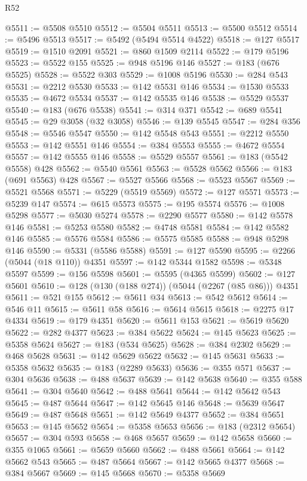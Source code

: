\begin{lexlean}{R52}
\begin{coremodule}
@5511 := @5508 @5510
@5512 := @5504 @5511
@5513 := @5500 @5512
@5514 := @5496 @5513
@5517 := @5492 (@5494 @5514 @4522)
@5518 := @127 @5517
@5519 := @1510 @2091
@5521 := @860 @1509 @2114
@5522 := @179 @5196
@5523 := @5522 @155
@5525 := @948 @5196 @146
@5527 := @183 (@676 @5525)
@5528 := @5522 @303
@5529 := @1008 @5196
@5530 := @284 @543
@5531 := @2212 @5530
@5533 := @142 @5531 @146
@5534 := @1530 @5533
@5535 := @4672 @5534
@5537 := @142 @5535 @146
@5538 := @5529 @5537
@5540 := @183 (@676 @5538)
@5541 := @314 @371
@5542 := @689 @5541
@5545 := @29 @3058 (@32 @3058)
@5546 := @139 @5545
@5547 := @284 @356
@5548 := @5546 @5547
@5550 := @142 @5548 @543
@5551 := @2212 @5550
@5553 := @142 @5551 @146
@5554 := @384 @5553
@5555 := @4672 @5554
@5557 := @142 @5555 @146
@5558 := @5529 @5557
@5561 := @183 (@5542 @5558) @428
@5562 := @5540 @5561
@5563 := @5528 @5562
@5566 := @183 (@691 @5563) @428
@5567 := @5527 @5566
@5568 := @5523 @5567
@5569 := @5521 @5568
@5571 := @5229 (@5519 @5569)
@5572 := @127 @5571
@5573 := @5239 @147
@5574 := @615 @5573
@5575 := @195 @5574
@5576 := @1008 @5298
@5577 := @5030 @5274
@5578 := @2290 @5577
@5580 := @142 @5578 @146
@5581 := @5253 @5580
@5582 := @4748 @5581
@5584 := @142 @5582 @146
@5585 := @5576 @5584
@5586 := @5575 @5585
@5588 := @948 @5298 @146
@5590 := @5331 (@5586 @5588)
@5591 := @127 @5590
@5595 := @2266 (@5044 (@18 @110)) @4351
@5597 := @142 @5344 @1582
@5598 := @5348 @5597
@5599 := @156 @5598
@5601 := @5595 (@4365 @5599)
@5602 := @127 @5601
@5610 := @128 (@130 (@188 @274)) (@5044 (@2267 (@85 @86))) @4351
@5611 := @521 @155
@5612 := @5611 @34
@5613 := @542 @5612
@5614 := @546 @11
@5615 := @5611 @58
@5616 := @5614 @5615
@5618 := @2275 @17 @4334
@5619 := @179 @4351
@5620 := @5611 @153
@5621 := @5619 @5620
@5622 := @282 @4377
@5623 := @384 @5622
@5624 := @145 @5623
@5625 := @5358 @5624
@5627 := @183 (@534 @5625)
@5628 := @384 @2302
@5629 := @468 @5628
@5631 := @142 @5629 @5622
@5632 := @145 @5631
@5633 := @5358 @5632
@5635 := @183 (@2289 @5633)
@5636 := @355 @571
@5637 := @304 @5636
@5638 := @488 @5637
@5639 := @142 @5638
@5640 := @355 @588
@5641 := @304 @5640
@5642 := @488 @5641
@5644 := @142 @5642 @543
@5645 := @487 @5644
@5647 := @142 @5645 @146
@5648 := @5639 @5647
@5649 := @487 @5648
@5651 := @142 @5649 @4377
@5652 := @384 @5651
@5653 := @145 @5652
@5654 := @5358 @5653
@5656 := @183 (@2312 @5654)
@5657 := @304 @593
@5658 := @468 @5657
@5659 := @142 @5658
@5660 := @355 @1065
@5661 := @5659 @5660
@5662 := @488 @5661
@5664 := @142 @5662 @543
@5665 := @487 @5664
@5667 := @142 @5665 @4377
@5668 := @384 @5667
@5669 := @145 @5668
@5670 := @5358 @5669

\end{coremodule}
\end{lexlean}
